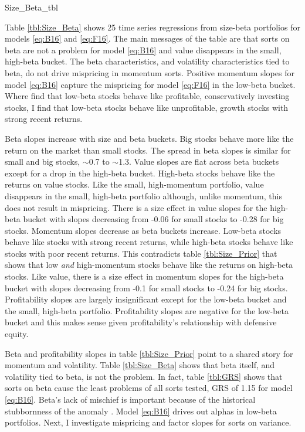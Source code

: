 
{Size_Beta_tbl}

Table \ref{tbl:Size_Beta} shows 25 time series regressions from size-beta
portfolios for models \ref{eq:B16} and \ref{eq:F16}.
The main messages of the table are that sorts on beta are not a problem for model
\ref{eq:B16} and value disappears in the small, high-beta bucket.
The beta characteristics, and volatility characteristics tied to beta, do not drive
mispricing in momentum sorts.
Positive momentum slopes for model \ref{eq:B16} capture the mispricing for 
model \ref{eq:F16} in the low-beta bucket.
Where \textcite{fama2016dissecting} find that low-beta stocks behave like
profitable, conservatively investing stocks, I find that low-beta stocks behave
like unprofitable, growth stocks with strong recent returns.

Beta slopes increase with size and beta buckets.
Big stocks behave more like the return on the market than small stocks.
The spread in beta slopes is similar for small and big stocks,
$\sim$0.7 to $\sim$1.3.
Value slopes are flat across beta buckets except for a drop in the high-beta
bucket.
High-beta stocks behave like the returns on value stocks.
Like the small, high-momentum portfolio, value disappears in the
small, high-beta portfolio although, unlike momentum,
this does not result in mispricing.
There is a size effect in value slopes for the high-beta bucket with slopes
decreasing from -0.06 for small stocks to -0.28 for big stocks.
Momentum slopes decrease as beta buckets increase.
Low-beta stocks behave like stocks with strong recent returns, while
high-beta stocks behave like stocks with poor recent returns.
This contradicts table \ref{tbl:Size_Prior} that shows that low \emph{and}
high-momentum stocks behave like the returns on high-beta stocks.
Like value, there is a size effect in momentum slopes for the high-beta bucket
with slopes decreasing from -0.1 for small stocks to -0.24 for big stocks.
Profitability slopes are largely insignificant except for the low-beta bucket
and the small, high-beta portfolio.
Profitability slopes are negative for the low-beta bucket and this makes sense
given profitability's relationship with defensive equity.

Beta and profitability slopes in table \ref{tbl:Size_Prior} point to a
shared story for momentum and volatility.
Table \ref{tbl:Size_Beta} shows that beta itself, and volatility tied to beta,
is not the problem.
In fact, table \ref{tbl:GRS} shows that sorts on beta cause the least problems
of all sorts tested, GRS of 1.15 for model \ref{eq:B16}.
Beta's lack of mischief is important because of the historical stubbornness of
the anomaly \parencite{jensen1972capital}.
Model \ref{eq:B16} drives out alphas in low-beta portfolios.
Next, I investigate mispricing and factor slopes for sorts on variance.
